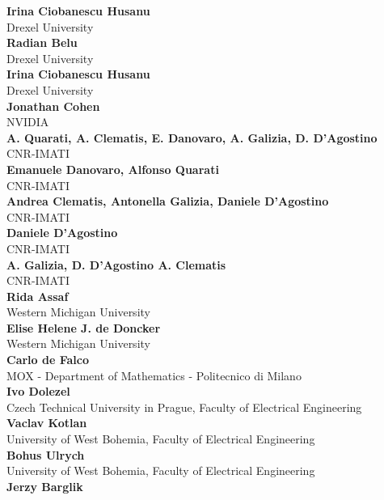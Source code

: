\documentclass[article,A4,11pt]{llncs}%
\begin{document}
        \noindent
    {\bf Irina Ciobanescu Husanu}\\
    Drexel University\\
        \noindent
    {\bf Radian Belu}\\
    Drexel University\\
        \noindent
    {\bf Irina Ciobanescu Husanu}\\
    Drexel University\\
        \noindent
    {\bf Jonathan Cohen}\\
    NVIDIA\\
        \noindent
    {\bf A. Quarati, A. Clematis, E. Danovaro, A. Galizia, D. D'Agostino}\\
    CNR-IMATI\\
        \noindent
    {\bf Emanuele Danovaro, Alfonso Quarati}\\
    CNR-IMATI\\
        \noindent
    {\bf Andrea Clematis, Antonella Galizia, Daniele D'Agostino}\\
    CNR-IMATI\\
        \noindent
    {\bf Daniele D'Agostino}\\
    CNR-IMATI\\
        \noindent
    {\bf A. Galizia, D. D'Agostino A. Clematis}\\
    CNR-IMATI\\
        \noindent
    {\bf Rida Assaf}\\
    Western Michigan University\\
        \noindent
    {\bf Elise Helene J. de Doncker}\\
    Western Michigan University\\
        \noindent
    {\bf Carlo de Falco}\\
    MOX - Department of Mathematics - Politecnico di Milano\\
        \noindent
    {\bf Ivo Dolezel}\\
    Czech Technical University in Prague, Faculty of Electrical Engineering\\
        \noindent
    {\bf Vaclav Kotlan}\\
    University of West Bohemia, Faculty of Electrical Engineering\\
        \noindent
    {\bf Bohus Ulrych}\\
    University of West Bohemia, Faculty of Electrical Engineering\\
        \noindent
    {\bf Jerzy Barglik}\\
\end{document}
